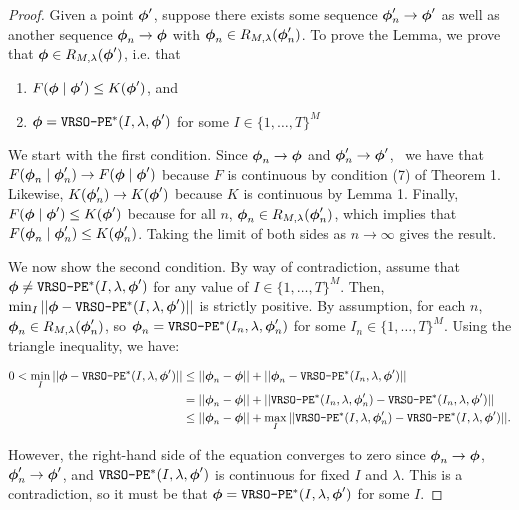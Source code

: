 \begin{proof}
     Given a point $\boldsymbol{\phi}'$, suppose there exists some sequence $\boldsymbol{\phi}'_{n} \to \boldsymbol{\phi}'$ as well as another sequence $\boldsymbol{\phi}_{n} \to \boldsymbol{\phi}$ with $\boldsymbol{\phi}_{n} \in R_{M,\lambda}(\boldsymbol{\phi}'_{n})$. To prove the Lemma, we prove that $\boldsymbol{\phi} \in R_{M,\lambda}(\boldsymbol{\phi}')$, i.e. that
    \begin{enumerate}
        \item $F(\boldsymbol{\phi} \mid \boldsymbol{\phi}') \leq K(\boldsymbol{\phi}')$, and
        \item $\boldsymbol{\phi} = \texttt{VRSO-PE}^*(I,\lambda,\boldsymbol{\phi}')$ for some $I \in \{1,\ldots,T\}^M$
    \end{enumerate}
    We start with the first condition. Since $\boldsymbol{\phi}_{n} \to \boldsymbol{\phi}$ and $\boldsymbol{\phi}'_{n} \to \boldsymbol{\phi}'$,  \ we have that $F(\boldsymbol{\phi}_{n} \mid \boldsymbol{\phi}'_{n}) \to F(\boldsymbol{\phi} \mid \boldsymbol{\phi}')$ because $F$ is continuous by condition (7) of Theorem 1. Likewise, $K(\boldsymbol{\phi}'_{n}) \to K(\boldsymbol{\phi}')$ because $K$ is continuous by Lemma 1. Finally, $F(\boldsymbol{\phi} \mid \boldsymbol{\phi}') \leq K(\boldsymbol{\phi}')$ because for all $n$, $\boldsymbol{\phi}_n \in R_{M,\lambda}(\boldsymbol{\phi}_n')$, which implies that $F(\boldsymbol{\phi}_{n} \mid \boldsymbol{\phi}'_{n}) \leq K(\boldsymbol{\phi}'_{n})$. Taking the limit of both sides as $n \to \infty$ gives the result.
    
    We now show the second condition. By way of contradiction, assume that $\boldsymbol{\phi} \neq \texttt{VRSO-PE}^*(I,\lambda,\boldsymbol{\phi}')$ for any value of $I \in \{1,\ldots,T\}^M$. Then, $\min_I ||\boldsymbol{\phi} - \texttt{VRSO-PE}^*(I,\lambda,\boldsymbol{\phi}')||$ is strictly positive. By assumption, for each $n$, $\boldsymbol{\phi}_{n} \in R_{M,\lambda}(\boldsymbol{\phi}'_{n})$, so $\boldsymbol{\phi}_{n} = \texttt{VRSO-PE}^*(I_n,\lambda,\boldsymbol{\phi}'_{n})$ for some $I_n \in \{1,\ldots,T\}^M$. Using the triangle inequality, we have:

    \begin{align}
        0 < \min_{I}||\boldsymbol{\phi} - \texttt{VRSO-PE}^*(I,\lambda,\boldsymbol{\phi}')|| &\leq ||\boldsymbol{\phi}_{n} - \boldsymbol{\phi}|| + ||\boldsymbol{\phi}_{n} - \texttt{VRSO-PE}^*(I_n,\lambda,\boldsymbol{\phi}')|| \\
        &= ||\boldsymbol{\phi}_{n} - \boldsymbol{\phi}|| + ||\texttt{VRSO-PE}^*(I_n,\lambda,\boldsymbol{\phi}'_{n}) - \texttt{VRSO-PE}^*(I_n,\lambda,\boldsymbol{\phi}')|| \\
        &\leq ||\boldsymbol{\phi}_{n} - \boldsymbol{\phi}|| + \max_{I} ||\texttt{VRSO-PE}^*(I,\lambda,\boldsymbol{\phi}'_{n}) - \texttt{VRSO-PE}^*(I,\lambda,\boldsymbol{\phi}')||.
    \end{align}
    
    However, the right-hand side of the equation converges to zero since $\boldsymbol{\phi}_n \to \boldsymbol{\phi}$, $\boldsymbol{\phi}'_n \to \boldsymbol{\phi}'$, and $\texttt{VRSO-PE}^*(I,\lambda,\boldsymbol{\phi}')$ is continuous for fixed $I$ and $\lambda$. This is a contradiction, so it must be that $\boldsymbol{\phi} = \texttt{VRSO-PE}^*(I,\lambda,\boldsymbol{\phi}')$ for some $I$.
\end{proof}

